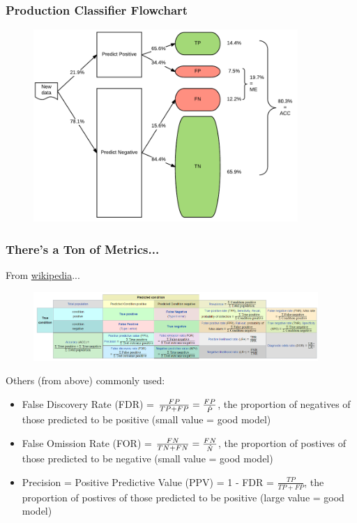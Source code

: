 \documentclass[handout]{beamer}
\begin{document}
\begin{frame}\frametitle{Production Classifier Flowchart}
\begin{figure}
\centering
\includegraphics[width=3.95in]{classifier_flowchart}
\end{figure}
\end{frame}


\begin{frame}\frametitle{There's a Ton of Metrics...}

From \href{https://en.wikipedia.org/wiki/Confusion\_matrix\#Table\_of\_confusion}{wikipedia}... 

\begin{figure}
\centering
\hspace{-0.5cm}\includegraphics[width=4.25in]{confusion_matrix.png}
\end{figure}

\footnotesize
Others (from above) commonly used:

\begin{itemize} \footnotesize
\item False Discovery Rate (FDR) = $\frac{FP}{TP + FP} = \frac{FP}{\hat{P}}$, the proportion of negatives of those predicted to be positive (small value = good model) \pause
\item False Omission Rate (FOR) = $\frac{FN}{TN + FN} = \frac{FN}{\hat{N}}$, the proportion of postives of those predicted to be negative (small value = good model) \pause
\item Precision = Positive Predictive Value (PPV) = 1 - FDR = $\frac{TP}{TP + FP}$, the proportion of postives of those predicted to be positive (large value = good model)
\end{itemize}
	
\end{frame}
\end{document}
